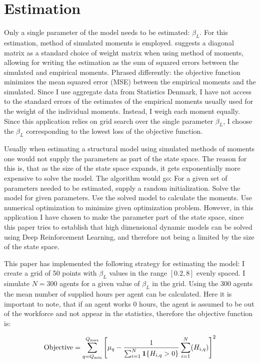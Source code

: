 \section{Estimation}

Only a single parameter of the model needs to be estimated: $\beta_L$. For this estimation, method of simulated moments is employed.  \textcite{eisenhauer_estimation_2015} suggests a diagonal matrix as a standard choice of weight matrix when using method of moments, allowing for writing the estimation as the sum of squared errors between the simulated and empirical moments. Phrased differently: the objective function minimizes the mean squared error (MSE) between the empirical moments and the simulated. Since I use aggregate data from Statistics Denmark, I have not access to the standard errors of the estimates of the empirical moments usually used for the weight of the individual moments. Instead, I weigh each moment equally. Since this application relies on grid search over the single parameter $\beta_L$, I choose the $\beta_L$ corresponding to the lowest loss of the objective function. 

Usually when estimating a structural model using simulated methods of moments one would not supply the parameters as part of the state space. The reason for this is, that as the size of the state space expands, it gets exponentially more expensive to solve the model. The algorithm would go: For a given set of parameters needed to be estimated, supply a random initialization. Solve the model for given parameters. Use the solved model to calculate the moments. Use numerical optimization to minimize given optimization problem. However, in this application I have chosen to make the parameter part of the state space, since this paper tries to establish that high dimensional dynamic models can be solved using Deep Reinforcement Learning, and therefore not being a limited by the size of the state space.

This paper has implemented the following strategy for estimating the model: I create a grid of 50 points with $\beta_L$ values in the range $[0.2, 8]$ evenly spaced. I simulate $N=300$ agents for a given value of $\beta_L$ in the grid. Using the 300 agents the mean number of supplied hours per agent can be calculated. Here it is important to note, that if an agent works 0 hours, the agent is assumed to be out of the workforce and not appear in the statistics, therefore the objective function is:

\begin{equation}
    \text{Objective} = \sum_{q=Q_{\min}}^{Q_{\max}} \left[ \mu_{q} -\frac{1}{\sum_{i=1}^{N} \mathbf{1}\{H_{i,q} > 0\}}\sum_{i=1}^N (H_{i,q})\right]^2
\end{equation}

